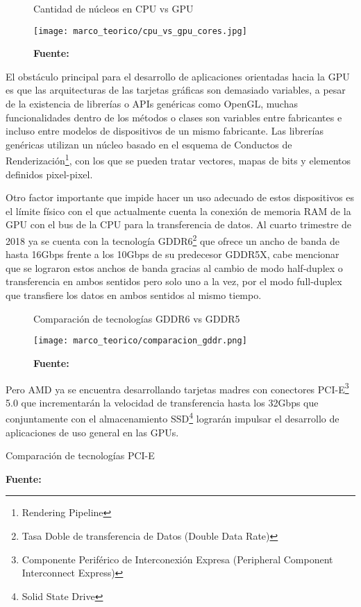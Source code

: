 \documentclass[../main/main.tex]{subfiles}
\begin{document}
  \begin{figure}[H]
    \centering
    \caption{Cantidad de núcleos en CPU vs GPU}
    \texttt{[image: marco\_teorico/cpu\_vs\_gpu\_cores.jpg]}
    \caption*{\textbf{Fuente:} \cite{web:gpgpu}}
  \end{figure}

  El obstáculo principal para el desarrollo de aplicaciones orientadas hacia la GPU es que las arquitecturas de las tarjetas gráficas son demasiado variables, a pesar de la existencia de librerías o APIs genéricas como OpenGL, muchas funcionalidades dentro de los métodos o clases son variables entre fabricantes e incluso entre modelos de dispositivos de un mismo fabricante. Las librerías genéricas utilizan un núcleo basado en el esquema de Conductos de Renderización\footnote{Rendering Pipeline}, con los que se pueden tratar vectores, mapas de bits y elementos definidos pixel-pixel.

  Otro factor importante que impide hacer un uso adecuado de estos dispositivos es el límite físico con el que actualmente cuenta la conexión de memoria RAM de la GPU con el bus de la CPU para la transferencia de datos. Al cuarto trimestre de 2018 ya se cuenta con la tecnología GDDR6\footnote{Tasa Doble de transferencia de Datos  (Double Data Rate)} que ofrece un ancho de banda de hasta 16Gbps frente a los 10Gbps de su predecesor GDDR5X, cabe mencionar que se lograron estos anchos de banda gracias al cambio de modo half-duplex o transferencia en ambos sentidos pero solo uno a la vez, por el modo full-duplex que transfiere los datos en ambos sentidos al mismo tiempo.

  \begin{figure}[H]
    \centering
    \caption{Comparación de tecnologías GDDR6 vs GDDR5}
    \texttt{[image: marco\_teorico/comparacion\_gddr.png]}
    \caption*{\textbf{Fuente:} \cite{web:comparacion_gddr}}
  \end{figure}

  Pero AMD ya se encuentra desarrollando tarjetas madres con conectores PCI-E\footnote{Componente Periférico de Interconexión Expresa (Peripheral Component Interconnect Express)} 5.0 que incrementarán la velocidad de transferencia hasta los 32Gbps que conjuntamente con el almacenamiento SSD\footnote{Solid State Drive} lograrán impulsar el desarrollo de aplicaciones de uso general en las GPUs.

  \begin{table}[H]
    \centering
    \caption{Comparación de tecnologías PCI-E}
    
    \caption*{\textbf{Fuente:} \cite{web:comparacion_pcie}}
  \end{table}
\end{document}
